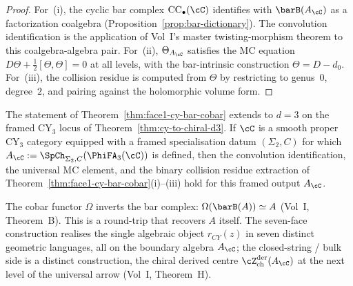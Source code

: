 \begin{proof}
For~(i), the cyclic bar complex $\mathrm{CC}_\bullet(\cC)$ identifies
with $\barB(A_\cC)$ as a factorization coalgebra
(Proposition~\ref{prop:bar-dictionary}). The convolution identification is
the application of Vol~I's master twisting-morphism theorem to this
coalgebra-algebra pair. For~(ii), $\Theta_{A_\cC}$ satisfies the MC
equation $D\Theta + \tfrac{1}{2}[\Theta,\Theta] = 0$ at all levels, with
the bar-intrinsic construction $\Theta = D - d_0$. For~(iii), the
collision residue is computed from $\Theta$ by restricting to genus~$0$,
degree~$2$, and pairing against the holomorphic volume form.
\end{proof}

\begin{theorem}[Face 1: CY bar-cobar realization, \texorpdfstring{$d = 3$}{d = 3}]
\label{thm:face1-cy-bar-cobar-d3}
The statement of Theorem~\ref{thm:face1-cy-bar-cobar} extends to
$d = 3$ on the framed CY$_3$ locus of
Theorem~\ref{thm:cy-to-chiral-d3}. If $\cC$ is a smooth proper
CY$_3$ category equipped with a framed specialisation datum
$(\Sigma_2,C)$ for which
$A_\cC := \SpCh_{\Sigma_2,C}(\PhiFA_3(\cC))$ is defined, then the convolution
identification, the universal MC element, and the binary collision
residue extraction of Theorem~\ref{thm:face1-cy-bar-cobar}(i)--(iii)
hold for this framed output $A_\cC$.
\end{theorem}

\begin{remark}
\label{rem:no-cobar-bulk-confusion}
The cobar functor $\Omega$ inverts the bar complex: $\Omega(\barB(A))
\simeq A$ (Vol~I, Theorem~B). This is a round-trip that recovers $A$
itself. The seven-face construction realises the single algebraic object
$r_{CY}(z)$ in seven distinct geometric languages, all on the
boundary algebra $A_\cC$; the closed-string / bulk side is a
distinct construction, the chiral derived centre
$\cZ^{\mathrm{der}}_{\mathrm{ch}}(A_\cC)$ at the next level of the
universal arrow (Vol~I, Theorem~H).
\end{remark}

